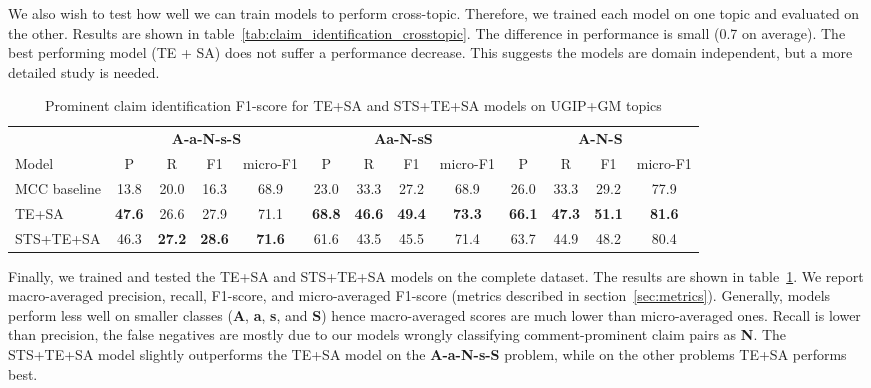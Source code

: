 We also wish to test how well we can train models to perform cross-topic. 
Therefore, we trained each model on one topic and evaluated on the other. 
Results are shown in table~\ref{tab:claim_identification_crosstopic}. 
The difference in performance is small (0.7 on average). 
The best performing model (TE + SA) does not suffer a performance decrease. 
This suggests the models are domain independent, but a more detailed study is needed. 

\begin{table}
\setlength{\tabcolsep}{5pt}
\centering
{\small
\begin{tabular}{l cccc cccc cccc}
\toprule
& \multicolumn{4}{c}{\textbf{A-a-N-s-S}} & \multicolumn{4}{c}{\textbf{Aa-N-sS}} & 
\multicolumn{4}{c}{\textbf{A-N-S}}\\
\cmidrule(lr){2-5}
\cmidrule(lr){6-9}
\cmidrule(lr){10-13}
Model
& P & R & F1 & micro-F1 & P & R & F1 & micro-F1 & P & R & F1 & micro-F1 \\
\midrule
MCC baseline & 13.8 & 20.0 & 16.3 & 68.9 & 23.0 & 33.3 & 27.2 & 68.9 & 26.0 & 33.3 & 29.2 & 77.9\\
TE+SA & \textbf{47.6} & 26.6 & 27.9 & 71.1 & \textbf{68.8} & \textbf{46.6} & \textbf{49.4} & \textbf{73.3} & \textbf{66.1} & \textbf{47.3} & \textbf{51.1} & \textbf{81.6} \\
STS+TE+SA & 46.3 & \textbf{27.2} & \textbf{28.6} & \textbf{71.6} & 61.6 & 43.5 & 45.5 & 71.4  & 63.7 & 44.9 & 48.2 & 80.4 \\
\bottomrule
\end{tabular}}
\caption{Prominent claim identification F1-score for TE+SA and STS+TE+SA models on UGIP+GM topics}
\label{tab:claim_identification_best}
\end{table}

Finally, we trained and tested the TE+SA and STS+TE+SA models on the complete 
\ComArg dataset. 
The results are shown in table~\ref{tab:claim_identification_best}. 
We report macro-averaged precision, recall, F1-score, and 
micro-averaged F1-score (metrics described in section~\ref{sec:metrics}). 
Generally, models perform less well on smaller classes (\textbf{A},
\textbf{a}, \textbf{s}, and \textbf{S}) hence macro-averaged scores are much lower than
micro-averaged ones. 
Recall is lower than precision, the false negatives are mostly due to our models
wrongly classifying comment-prominent claim pairs as \textbf{N}. 
The STS+TE+SA model slightly outperforms the TE+SA model on the \textbf{A-a-N-s-S} problem,
while on the other problems TE+SA performs best. 

